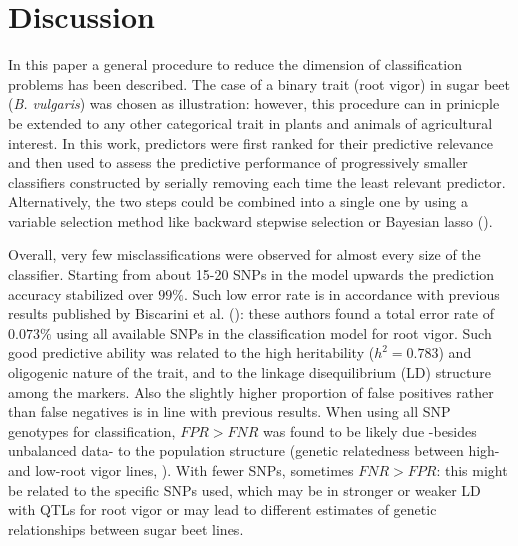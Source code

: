 \section{Discussion}
\label{sec:discussion}
In this paper a general procedure to reduce the dimension of classification
problems has been described. The case of a binary trait (root vigor) in sugar beet
(\emph{B. vulgaris}) was chosen as illustration: however, this procedure
can in prinicple be extended to any other categorical trait in plants and
animals of agricultural interest.
In this work, predictors were first ranked for their predictive
relevance and then used to assess the predictive performance of
progressively smaller classifiers constructed by serially removing each
time the least relevant predictor. Alternatively, the two steps could be
combined into a single one by using a variable selection method like
backward stepwise selection or Bayesian lasso (\cite{hastie2009model}). 

  
Overall, very few misclassifications were observed for almost every size
of the classifier. Starting from about 15-20 SNPs in the model upwards the prediction
accuracy stabilized over $99\%$. Such low error rate is in accordance
with previous results published by Biscarini et al.
(\cite{biscarini2014genome}): these authors found a total error rate of
$0.073\%$ using all available SNPs in the classification model for root vigor. Such
good predictive ability was related to the high heritability ($h^2=0.783$)
and oligogenic nature of the trait, and to the linkage disequilibrium
(LD) structure among the markers. Also the slightly higher proportion of
false positives rather than false negatives is in line with previous
results. When using all SNP genotypes for classification, $FPR>FNR$ was
found to be likely due -besides unbalanced data- to the population structure (genetic relatedness between
high- and low-root vigor lines, \cite{biscarini2014genome}). With fewer
SNPs, sometimes $FNR>FPR$: this might be related to the specific SNPs
used, which may be in stronger or weaker LD with QTLs for root vigor or may lead to
different estimates of genetic relationships between sugar beet lines. 


